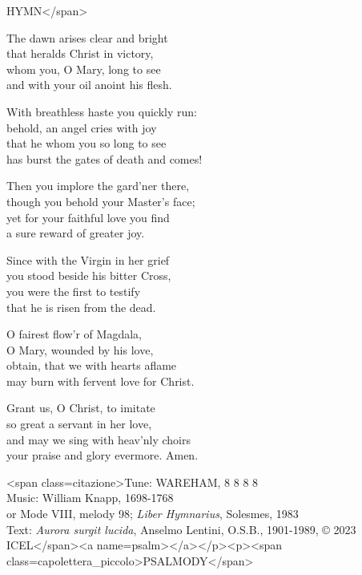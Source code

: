 \hymn

\begin{hymnverse}
HYMN</span>

The dawn arises clear and bright\\
that heralds Christ in victory,\\
whom you, O Mary, long to see\\
and with your oil anoint his flesh.

With breathless haste you quickly run:\\
behold, an angel cries with joy\\
that he whom you so long to see\\
has burst the gates of death and comes!

Then you implore the gard’ner there,\\
though you behold your Master’s face;\\
yet for your faithful love you find\\
a sure reward of greater joy.

Since with the Virgin in her grief\\
you stood beside his bitter Cross,\\
you were the first to testify\\
that he is risen from the dead.

O fairest flow’r of Magdala,\\
O Mary, wounded by his love,\\
obtain, that we with hearts aflame\\
may burn with fervent love for Christ.

Grant us, O Christ, to imitate\\
so great a servant in her love,\\
and may we sing with heav’nly choirs\\
your praise and glory evermore. Amen.

<span class=citazione>Tune: WAREHAM, 8 8 8 8\\
Music: William Knapp, 1698-1768\\
or Mode VIII, melody 98; \emph{Liber Hymnarius}, Solesmes, 1983\\
Text: \emph{Aurora surgit lucida}, Anselmo Lentini, O.S.B., 1901-1989, © 2023 ICEL</span><a name=psalm></a></p><p><span class=capolettera_piccolo>PSALMODY</span>
\end{hymnverse}

\begin{hymnsource}

\end{hymnsource}